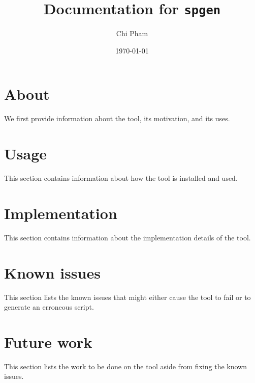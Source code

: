 \documentclass[a4paper,11pt]{article}
\title{\textbf{Documentation for \texttt{spgen}}}
\date{\today}
\author{Chi Pham}
\begin{document}
\maketitle
\tableofcontents
\newpage

\section{About}
We first provide information about the tool, its motivation, and its uses.

\clearpage

\section{Usage}
This section contains information about how the tool is installed and used.

\clearpage

\section{Implementation}
This section contains information about the implementation details of the tool.

\clearpage

\section{Known issues}
This section lists the known issues that might either cause the tool to fail or to generate an erroneous script.

\clearpage

\section{Future work}
This section lists the work to be done on the tool aside from fixing the known issues.

\end{document}
